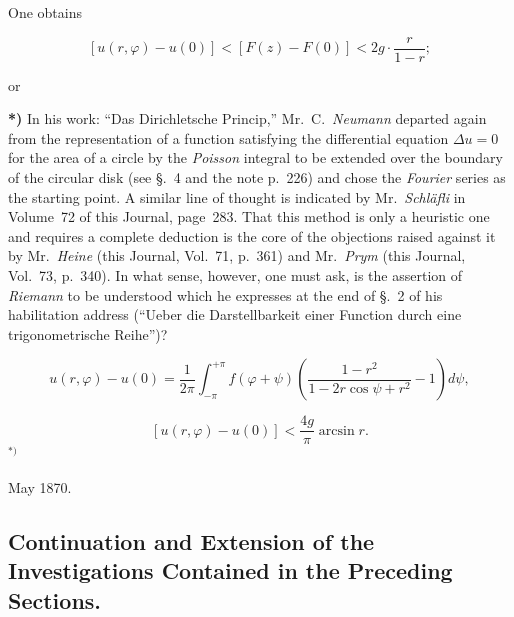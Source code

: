 \documentclass{article}
\begin{document}
One obtains

\[

[u(r, \varphi) - u(0)] < [F(z) - F(0)] < 2g \cdot \frac{r}{1 - r};

\]

or









\textbf{*)} In his work: ``Das Dirichletsche Princip,'' Mr.~C.~\emph{Neumann} departed again from the representation of a function satisfying the differential equation $\Delta u = 0$ for the area of a circle by the \emph{Poisson} integral to be extended over the boundary of the circular disk (see §.~4 and the note p.~226) and chose the \emph{Fourier} series as the starting point. A similar line of thought is indicated by Mr.~\emph{Schläfli} in Volume~72 of this Journal, page~283. That this method is only a heuristic one and requires a complete deduction is the core of the objections raised against it by Mr.~\emph{Heine} (this Journal, Vol.~71, p.~361) and Mr.~\emph{Prym} (this Journal, Vol.~73, p.~340). In what sense, however, one must ask, is the assertion of \emph{Riemann} to be understood which he expresses at the end of §.~2 of his habilitation address (``Ueber die Darstellbarkeit einer Function durch eine trigonometrische Reihe'')?




\[

u(r, \varphi) - u(0) = \frac{1}{2\pi} \int_{-\pi}^{+\pi} f(\varphi + \psi) \left( \frac{1 - r^2}{1 - 2r \cos\psi + r^2} - 1 \right) d\psi,

\]

\[

[u(r, \varphi) - u(0)] < \frac{4g}{\pi} \arcsin r.

\]${}^{*)}$



\begin{flushright}

May 1870.

\end{flushright}







\subsection*{Continuation and Extension of the Investigations Contained in the Preceding Sections.}
\end{document}
